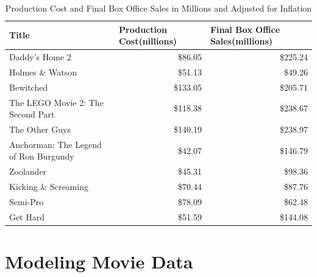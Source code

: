 \documentclass[11pt]{article}
\begin{document}
    \begin{table}[H]
        \centering
        \scriptsize
        \caption{Production Cost and Final Box Office Sales in Millions and Adjusted for Inflation}
        \begin{tabular}{|l|r|r|}
        \hline
        \textbf{Title}                                 & \multicolumn{1}{l|}{\textbf{Production Cost(nillions)}} & \multicolumn{1}{l|}{\textbf{Final Box Office Sales(millions)}} \\ \hline
        Daddy's Home 2                        & \$86.05                                                                & \$225.24 \\ \hline
        Holmes \& Watson                      & \$51.13                                                                & \$49.26  \\ \hline
        Bewitched                             & \$133.05                                                               & \$205.71 \\ \hline
        The LEGO Movie 2: The Second Part     & \$118.38                                                               & \$238.67 \\ \hline
        The Other Guys                        & \$140.19                                                               & \$238.97 \\ \hline
        Anchorman: The Legend of Ron Burgundy & \$42.07                                                                & \$146.79 \\ \hline
        Zoolander                             & \$45.31                                                                & \$98.36  \\ \hline
        Kicking \& Screaming                  & \$70.44                                                                & \$87.76  \\ \hline
        Semi-Pro                              & \$78.09                                                                & \$62.48  \\ \hline
        Get Hard                              & \$51.59                                                                & \$144.08 \\ \hline
        \end{tabular}
    \end{table}

\section{\centering Modeling Movie Data}
\end{document}
